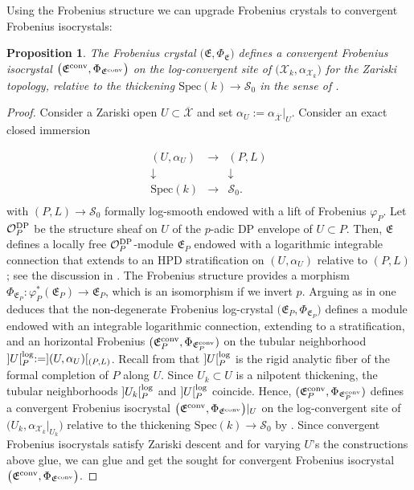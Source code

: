 \documentclass[asterisque,english]{smfart}
\newtheorem{proposition}[theo]{Proposition}
\begin{document}
Using the Frobenius structure we can upgrade Frobenius crystals to convergent Frobenius isocrystals:

\begin{proposition}\label{prop:Econv}
The  Frobenius crystal $\bigl(\mathfrak{E},\Phi_{\mathfrak{E}}\bigr)$  defines a convergent Frobenius isocrystal  $\bigl(\mathfrak{E}^{\rm conv},\Phi_{\mathfrak{E}^{\rm conv}}\bigr)$ on the log-convergent site of $\bigl(\mathcal{X}_k,\alpha_{\mathcal{X}_k}\bigr)$ for the Zariski topology, relative to the  thickening  $\mathrm{Spec}(k) \to \mathcal{S}_0$ in the sense of \cite[Def.~2.1.5]{Shiho}.
\end{proposition}
\begin{proof} 
Consider a Zariski open $U \subset \overline{\mathcal{X}}$ and set $\alpha_U:= \alpha_{\overline{\mathcal{X}}}\vert_U$. Consider an exact closed immersion 

$$
\begin{array}{cccccccccc}
(U, \alpha_U) & \longrightarrow &   (P,L) \\
\downarrow&& \downarrow \\
\mathrm{Spec}(k) &\longrightarrow& \mathcal{S}_0 .\\
\end{array}
$$with $(P,L)\to \mathcal{S}_0$ formally log-smooth endowed with a lift of Frobenius $\varphi_P$. Let $\mathcal{O}_P^{\rm DP}$ be the structure sheaf on $U$ of the $p$-adic DP envelope of $U\subset P$. Then,  $\mathfrak{E}$ defines a locally free $\mathcal{O}_P^{\rm DP}$-module $\mathfrak{E}_P$ endowed with a logarithmic integrable connection that extends to an HPD stratification on $(U, \alpha_U)$ relative to $(P,L)$; see the discussion in \cite[\S 4.3]{ShihoI}. The Frobenius structure provides a morphism $\Phi_{\mathfrak{E}_P}\colon \varphi_P^\ast(\mathfrak{E}_P) \to \mathfrak{E}_P$, which is an isomorphism if we invert $p$. Arguing as in \cite[\S 2.4.1]{Berthelot}  one deduces that the non-degenerate Frobenius log-crystal $\bigl(\mathfrak{E}_P,\Phi_{\mathfrak{E}_P}\bigr)$ defines a module endowed with an integrable logarithmic connection,  extending to a stratification, and an horizontal Frobenius $(\mathfrak{E}_P^{\rm conv}, \Phi_{\mathfrak{E}_P^{\rm conv}})$ on the tubular neighborhood $]U[^{\rm log}_P:=](U, \alpha_U) [_{(P,L)}$. Recall from \cite[Def. 2.2.5]{Shiho} that $]U[^{\rm log}_P$ is  the rigid analytic fiber of the formal completion of $P$ along $U$. Since  $U_k\subset U$ is a nilpotent thickening, the tubular neighborhoods $]U_k[^{\rm log}_P$ and $]U[^{\rm log}_P$ coincide. Hence,  $(\mathfrak{E}_P^{\rm conv}, \Phi_{\mathfrak{E}_P^{\rm conv}})$ defines a convergent Frobenius isocrystal  $\bigl(\mathfrak{E}^{\rm conv},\Phi_{\mathfrak{E}^{\rm conv}}\bigr)\vert_{U}$   on the log-convergent site of $\bigl(U_k,\alpha_{\mathcal{X}_k}\vert_{U_k}\bigr)$ relative to the  thickening  $\mathrm{Spec}(k) \to \mathcal{S}_0$ by \cite[Prop. 2.2.7]{Shiho}. Since  convergent Frobenius isocrystals satisfy Zariski descent and for varying $U$'s the constructions above glue,  we can glue and get the sought for  convergent Frobenius isocrystal $\bigl(\mathfrak{E}^{\rm conv},\Phi_{\mathfrak{E}^{\rm conv}}\bigr)$.
\end{proof}
\end{document}
